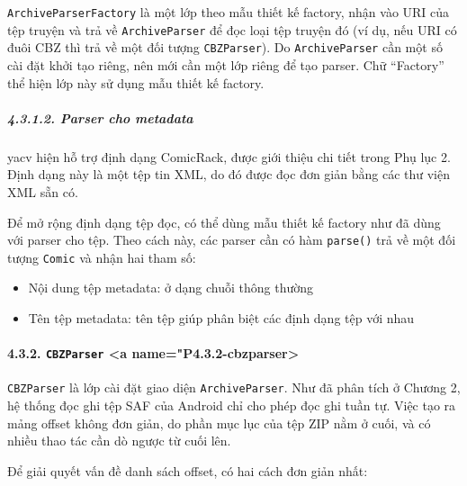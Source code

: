 \documentclass[
]{article}
\begin{document}
\texttt{ArchiveParserFactory} là một lớp theo mẫu thiết kế factory, nhận
vào URI của tệp truyện và trả về \texttt{ArchiveParser} để đọc loại tệp
truyện đó (ví dụ, nếu URI có đuôi CBZ thì trả về một đối tượng
\texttt{CBZParser}). Do \texttt{ArchiveParser} cần một số cài đặt khởi
tạo riêng, nên mới cần một lớp riêng để tạo parser. Chữ ``Factory'' thể
hiện lớp này sử dụng mẫu thiết kế factory.

\hypertarget{parser-cho-metadata}{%
\subparagraph{4.3.1.2. Parser cho metadata}\label{parser-cho-metadata}}

yacv hiện hỗ trợ định dạng ComicRack, được giới thiệu chi tiết trong Phụ
lục 2. Định dạng này là một tệp tin XML, do đó được đọc đơn giản bằng
các thư viện XML sẵn có.

Để mở rộng định dạng tệp đọc, có thể dùng mẫu thiết kế factory như đã
dùng với parser cho tệp. Theo cách này, các parser cần có hàm
\texttt{parse()} trả về một đối tượng \texttt{Comic} và nhận hai tham
số:

\begin{itemize}
\item
  Nội dung tệp metadata: ở dạng chuỗi thông thường
\item
  Tên tệp metadata: tên tệp giúp phân biệt các định dạng tệp với nhau
\end{itemize}

\hypertarget{cbzparser-a-namep4.3.2-cbzparser}{%
\paragraph{\texorpdfstring{4.3.2. \texttt{CBZParser} \textless a
name="P4.3.2-cbzparser\textgreater{}}{4.3.2. CBZParser \textless a name="P4.3.2-cbzparser\textgreater{}}}\label{cbzparser-a-namep4.3.2-cbzparser}}

\texttt{CBZParser} là lớp cài đặt giao diện \texttt{ArchiveParser}. Như
đã phân tích ở Chương 2, hệ thống đọc ghi tệp SAF của Android chỉ cho
phép đọc ghi tuần tự. Việc tạo ra mảng offset không đơn giản, do phần
mục lục của tệp ZIP nằm ở cuối, và có nhiều thao tác cần dò ngược từ
cuối lên.

Để giải quyết vấn đề danh sách offset, có hai cách đơn giản nhất:
\end{document}
